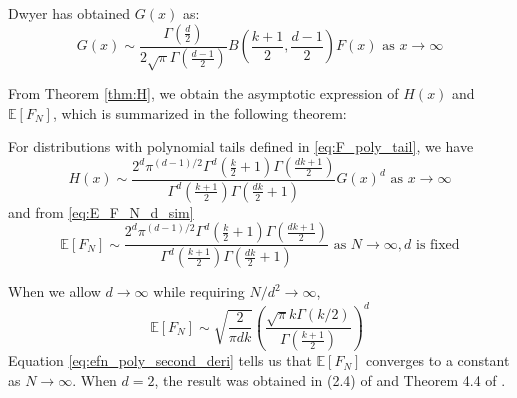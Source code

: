 \documentclass{aptpub}
\def\E{\mathbb{E}}
\begin{document}
Dwyer\cite{dwyer1991convex} has obtained $G(x)$ as:
\begin{equation}
     G(x) \sim \frac{\Gamma(\frac{d}{2})}{2\sqrt{\pi} \Gamma(\frac{d-1}{2})}
     B\left(\frac{k+1}{2}, \frac{d-1}{2}\right) F(x)  \textrm{ as } x\to \infty
\end{equation}

From Theorem \ref{thm:H}, we obtain the asymptotic
expression of $H(x)$ and $\E[F_N]$, which is
summarized in the following theorem:
\begin{theorem}
     For distributions with polynomial tails defined in \eqref{eq:F_poly_tail},
     we have
\begin{equation}
     H(x) \sim \frac{2^d \pi^{(d-1)/2}\Gamma^d(\frac{k}{2}+1)
     \Gamma(\frac{dk+1}{2})}{
         \Gamma^d(\frac{k+1}{2}) \Gamma(\frac{dk}{2}+1)} G(x)^d 
         \textrm{ as } x\to \infty
\end{equation}
and from \eqref{eq:E_F_N_d_sim}
\begin{equation}\label{eq:efn_poly_second_deri}
    \E[F_N] \sim \frac{2^d \pi^{(d-1)/2}\Gamma^d(\frac{k}{2}+1)
    \Gamma(\frac{dk+1}{2})}{
        \Gamma^d(\frac{k+1}{2}) \Gamma(\frac{dk}{2}+1)}
        \textrm{ as } N \to \infty, d \textrm { is fixed}
\end{equation}
\end{theorem}
When we allow $d\to \infty$ while requiring $N/d^2 \to \infty$,
\begin{equation}\label{eq:poly_E_F_N_d_infty}
\E[F_N] \sim \sqrt{\frac{2}{\pi dk}}\left(
     \frac{\sqrt{\pi}k \Gamma(k/2)}
     {\Gamma(\frac{k+1}{2})}
 \right)^d
\end{equation}
Equation \eqref{eq:efn_poly_second_deri} tells
us that $\E[F_N]$ converges to a constant as $N \to \infty$.
When $d=2$, the result was obtained in (2.4) of \cite{carnal1970konvexe}
and Theorem 4.4 of \cite{davis1987convex}.
\end{document}

